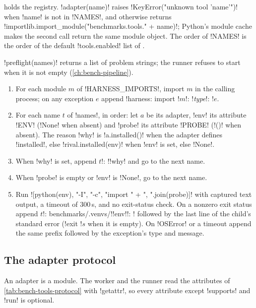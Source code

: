  holds the registry. \py!adapter(name)! raises \py!KeyError("unknown tool 'name'")! when \py!name! is not in \py!NAMES!, and otherwise returns \py!importlib.import_module("benchmarks.tools." + name)!; Python's module cache makes the second call return the same module object. The order of \py!NAMES! is the order of the default \code!tools.enabled! list of .

\begin{algorithm}[Preflight]\label{alg:bench-tools-preflight}
\py!preflight(names)! returns a list of problem strings; the runner refuses to start when it is not empty (\cref{ch:bench-pipeline}).
\begin{enumerate}
\item For each module $m$ of \py!HARNESS_IMPORTS!, import $m$ in the calling process; on any exception $e$ append \code!harness: import !$m$\code!: !\textit{type}\code!: !$e$.
\item For each name $t$ of \py!names!, in order: let $a$ be its adapter, \py!env! its attribute \py!ENV! (\py!None! when absent) and \py!probe! its attribute \py!PROBE! (\py!()! when absent). The reason \py!why! is \py!a.installed()! when the adapter defines \py!installed!, else \py!rival.installed(env)! when \py!env! is set, else \py!None!.
\item When \py!why! is set, append $t$\code!: !\py!why! and go to the next name.
\item When \py!probe! is empty or \py!env! is \py!None!, go to the next name.
\item Run \py![python(env), "-I", "-c", "import " + ", ".join(probe)]! with captured text output, a timeout of $300$\,s, and no exit-status check. On a nonzero exit status append $t$\code!: benchmarks/.venvs/!\py!env!\code!: ! followed by the last line of the child's standard error (\code!exit !$s$ when it is empty). On \py!OSError! or a timeout append the same prefix followed by the exception's type and message.
\end{enumerate}
\end{algorithm}

\subsection{The adapter protocol}\label{sec:bench-tools-protocol}

An adapter is a module. The worker and the runner read the attributes of \cref{tab:bench-tools-protocol} with \py!getattr!, so every attribute except \py!supports! and \py!run! is optional.

